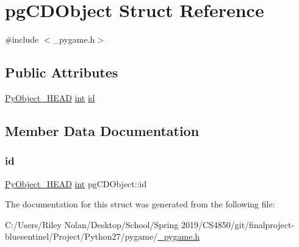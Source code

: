 \hypertarget{structpg_c_d_object}{}\section{pg\+C\+D\+Object Struct Reference}
\label{structpg_c_d_object}


{\ttfamily \#include $<$\+\_\+pygame.\+h$>$}

\subsection*{Public Attributes}
\begin{DoxyCompactItemize}
\item 
\mbox{\hyperlink{_python27_2object_8h_a0bf35c1f3ea13f925de94d8593db3b7e}{Py\+Object\+\_\+\+H\+E\+AD}} \mbox{\hyperlink{warnings_8h_a74f207b5aa4ba51c3a2ad59b219a423b}{int}} \mbox{\hyperlink{structpg_c_d_object_a1b035edcb98ecd55e0ba0587f2870766}{id}}
\end{DoxyCompactItemize}


\subsection{Member Data Documentation}
\mbox{\label{structpg_c_d_object_a1b035edcb98ecd55e0ba0587f2870766}} 
\subsubsection{\texorpdfstring{id}{id}}
{\footnotesize\ttfamily \mbox{\hyperlink{_python27_2object_8h_a0bf35c1f3ea13f925de94d8593db3b7e}{Py\+Object\+\_\+\+H\+E\+AD}} \mbox{\hyperlink{warnings_8h_a74f207b5aa4ba51c3a2ad59b219a423b}{int}} pg\+C\+D\+Object\+::id}



The documentation for this struct was generated from the following file\+:\begin{DoxyCompactItemize}
\item 
C\+:/\+Users/\+Riley Nolan/\+Desktop/\+School/\+Spring 2019/\+C\+S4850/git/finalproject-\/bluesentinel/\+Project/\+Python27/pygame/\mbox{\hyperlink{__pygame_8h}{\+\_\+pygame.\+h}}\end{DoxyCompactItemize}
